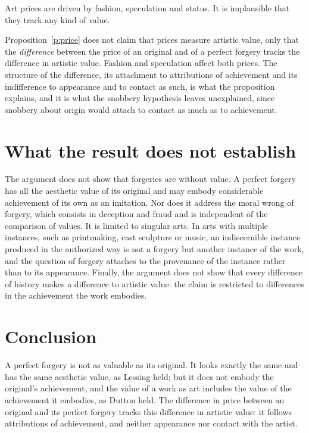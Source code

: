 \documentclass{situationist-preprint}
\begin{document}
\begin{objection}[Prices]\label{o:market}
Art prices are driven by fashion, speculation and status. It is implausible that they track any kind of value.
\end{objection}

\begin{reply}
Proposition~\ref{p:price} does not claim that prices measure artistic value, only that the \emph{difference} between the price of an original and of a perfect forgery tracks the difference in artistic value. Fashion and speculation affect both prices. The structure of the difference, its attachment to attributions of achievement and its indifference to appearance and to contact as such, is what the proposition explains, and it is what the snobbery hypothesis leaves unexplained, since snobbery about origin would attach to contact as much as to achievement.
\end{reply}

\section{What the result does not establish}

The argument does not show that forgeries are without value. A perfect forgery has all the aesthetic value of its original and may embody considerable achievement of its own as an imitation. Nor does it address the moral wrong of forgery, which consists in deception and fraud and is independent of the comparison of values. It is limited to singular arts. In arts with multiple instances, such as printmaking, cast sculpture or music, an indiscernible instance produced in the authorized way is not a forgery but another instance of the work, and the question of forgery attaches to the provenance of the instance rather than to its appearance. Finally, the argument does not show that every difference of history makes a difference to artistic value: the claim is restricted to differences in the achievement the work embodies.

\section{Conclusion}

A perfect forgery is not as valuable as its original. It looks exactly the same and has the same aesthetic value, as Lessing held; but it does not embody the original's achievement, and the value of a work as art includes the value of the achievement it embodies, as Dutton held. The difference in price between an original and its perfect forgery tracks this difference in artistic value: it follows attributions of achievement, and neither appearance nor contact with the artist.
\end{document}
